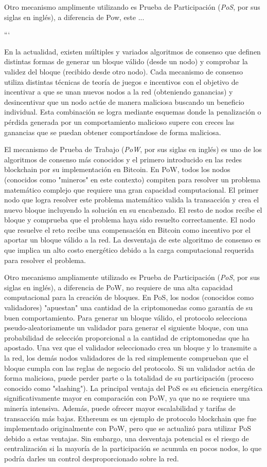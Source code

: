 Otro mecanismo amplimente utilizando es Prueba de Participación (\textit{PoS}, por sus siglas en inglés), a diferencia de Pow, este ...

```

En la actualidad, existen múltiples y variados algoritmos de consenso que definen distintas formas de generar un bloque válido (desde un nodo) y comprobar la validez del bloque (recibido desde otro nodo). Cada mecanismo de consenso utiliza distintas técnicas de teoría de juegos e incentivos con el objetivo de incentivar a que se unan nuevos nodos a la red (obteniendo ganancias) y desincentivar que un nodo actúe de manera maliciosa buscando un beneficio individual. Esta combinación se logra mediante esquemas donde la penalización o pérdida generada por un comportamiento malicioso supere con creces las ganancias que se puedan obtener comportándose de forma maliciosa.

El mecanismo de Prueba de Trabajo (\textit{PoW}, por sus siglas en inglés) es uno de los algoritmos de consenso más conocidos y el primero introducido en las redes blockchain por su implementación en Bitcoin. En PoW, todos los nodos (conocidos como "mineros" en este contexto) compiten para resolver un problema matemático complejo que requiere una gran capacidad computacional. El primer nodo que logra resolver este problema matemático valida la transacción y crea el nuevo bloque incluyendo la solución en su encabezado. El resto de nodos recibe el bloque y comprueba que el problema haya sido resuelto correctamente. El nodo que resuelve el reto recibe una compensación en Bitcoin como incentivo por el aportar un bloque válido a la red. La desventaja de este algoritmo de consenso es que implica un alto costo energético debido a la carga computacional requerida para resolver el problema.

Otro mecanismo ampliamente utilizado es Prueba de Participación (\textit{PoS}, por sus siglas en inglés), a diferencia de PoW, no requiere de una alta capacidad computacional para la creación de bloques. En PoS, los nodos (conocidos como validadores) "apuestan" una cantidad de la criptomonedas como garantía de su buen comportamiento. Para generar un bloque válido, el protocolo selecciona pseudo-aleatoriamente un validador para generar el siguiente bloque, con una probabilidad de selección proporcional a la cantidad de criptomonedas que ha apostado. Una vez que el validador seleccionado crea un bloque y lo transmite a la red, los demás nodos validadores de la red simplemente comprueban que el bloque cumpla con las reglas de negocio del protocolo. Si un validador actúa de forma maliciosa, puede perder parte o la totalidad de su participación (proceso conocido como "slashing"). La principal ventaja del PoS es su eficiencia energética significativamente mayor en comparación con PoW, ya que no se requiere una minería intensiva. Además, puede ofrecer mayor escalabilidad y tarifas de transacción más bajas. Ethereum es un ejemplo de protocolo blockchain que fue implementado originalmente con PoW, pero que se actualizó para utilizar PoS debido a estas ventajas. Sin embargo, una desventaja potencial es el riesgo de centralización si la mayoría de la participación se acumula en pocos nodos, lo que podría darles un control desproporcionado sobre la red.


